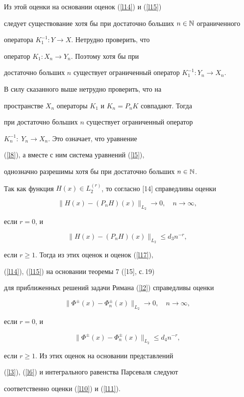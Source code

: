 \begin{pf}
\begin{equation}
\end{equation}


Из этой оценки на основании оценок (\ref{l14}) и (\ref{l15})


следует существование хотя бы при достаточно больших $n\in\Bbb N$ ограниченного


оператора $K^{-1}_1: Y\rightarrow X$. Нетрудно проверить, что


оператор $K_1: X_n\rightarrow Y_n$. Поэтому хотя бы при


достаточно больших $n$ существует ограниченный оператор $K^{-1}_1:


Y_n\rightarrow X_n$.





В силу сказанного выше нетрудно проверить, что на


пространстве $X_n$ операторы $K_1$ и $K_n=P_nK$ совпадают. Тогда


при достаточно больших $n$ существует ограниченный оператор


$K^{-1}_n: \; Y_n\rightarrow X_n$. Это означает, что уравнение


(\ref{l8}), а вместе с ним система уравнений (\ref{l5}),


однозначно разрешимы хотя бы при достаточно больших $n\in\Bbb N$.





Так как функция $H(x) \in L_2^{(r)}$, то согласно [14] справедливы оценки


$$


\|H(x)-(P_nH)(x)\|_{L_2}\rightarrow 0, \quad n \rightarrow\infty,


$$


если $r=0$, и


$$


\|H(x)-(P_nH)(x)\|_{L_2}\leqslant d_3n^{-r},


$$


если $r\geqslant 1$. Тогда из этих оценок и оценок (\ref{l17}),


(\ref{l14}), (\ref{l15}) на основании теоремы 7 ([15], с.\,19)


для приближенных решений задачи Римана (\ref{l2}) справедливы оценки


$$


\|\Phi^\pm(x)-\Phi^\pm_n(x)\|_{L_2}\rightarrow 0, \quad n


\rightarrow\infty,


$$


если $r=0$, и


$$


\|\Phi^\pm(x)-\Phi^\pm_n(x)\|_{L_2}\leqslant d_4n^{-r},


$$


если $r\geqslant1$. Из этих оценок на основании представлений


(\ref{l3}), (\ref{l6}) и интегрального равенства Парсеваля следуют


соответственно оценки (\ref{l10}) и (\ref{l11}).


\end{pf}








